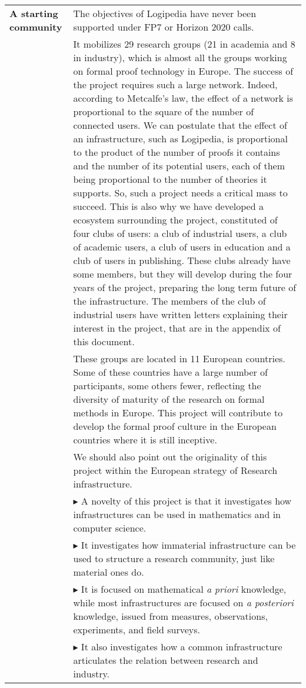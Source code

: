 \begin{longtable}{|p{}|p{}|}
{\bf A starting community}
&
The objectives of Logipedia have never 
been supported under FP7 or Horizon 2020 calls.\\
&
\hspace{0.4cm} It mobilizes 29 research groups (21 in
academia and 8 in industry), which is
almost all the groups working on formal proof technology in Europe.
The success of the project requires such a large network.  Indeed,
according to Metcalfe's law, the effect of a network is
proportional to the square of the number of connected users. We can
postulate that the effect of an infrastructure, such as Logipedia, is
proportional to the product of the number of proofs it contains and
the number of its potential users, each of them being proportional to
the number of theories it supports. So, such a project needs a
critical mass to succeed. This is also why we have developed a ecosystem 
surrounding the project, constituted of four clubs of users: 
a club of industrial users, a club of academic users, a club of users in 
education and a club of users in publishing.
These clubs
already have some members, but they will develop during the four years
of the project, preparing the long term future of the infrastructure.
The members of the club of industrial users have written letters 
explaining their interest in the project, that are in the appendix of this
document. 
\\
&
\hspace{0.4cm}
These groups are located in 11 European countries.  Some of these
countries have a large number of participants, some others fewer,
reflecting the diversity of maturity of the research on formal methods
in Europe. This project will contribute to develop the formal proof
culture in the European countries where it is still inceptive.\\
&
\hspace{0.4cm}
We should also point out the originality of this project within the
European strategy of Research infrastructure.\\
&
$\blacktriangleright$ A novelty of this project is that it
investigates how infrastructures can be used in mathematics and in
computer science.\\
&
$\blacktriangleright$ It investigates how immaterial infrastructure
can be used to structure a research community, just like material ones
do.\\
&
$\blacktriangleright$ It is focused on mathematical {\em a priori}
knowledge, while most infrastructures are focused on {\em a
  posteriori} knowledge, issued from measures, observations,
experiments, and field surveys.\\
&
$\blacktriangleright$ It also investigates how a common infrastructure
articulates the relation between research and industry.
\\
\hline


\end{longtable}
